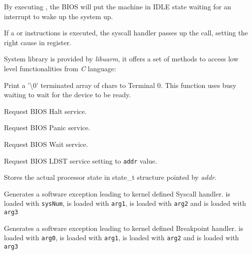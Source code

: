 
By executing , the BIOS will put the machine in IDLE state waiting for an interrupt to wake up the system up.


If a  or  instructions is executed, the syscall handler passes up the call, setting the right cause in  register.

\label{sec:man:systemLibrary}

System library is provided by \emph{libuarm}, it offers a set of methods to access low level functionalities from \emph{C} language:


Print a '\textbackslash0' terminated array of chars to Terminal 0.
This function uses busy waiting to wait for the device to be ready.

\label{sec:man:HALT}

Request BIOS Halt service.


Request BIOS Panic service.


Request BIOS Wait service.


Request BIOS LDST service setting  to \texttt{addr} value.


Stores the actual processor state in state\_t structure pointed by \emph{addr}.

\label{sec:man:SYSCALL}

Generates a software exception leading to kernel defined Syscall handler.
 is loaded with \texttt{sysNum},  is loaded with \texttt{arg1},  is loaded with \texttt{arg2} and  is loaded with \texttt{arg3}


Generates a software exception leading to kernel defined Breakpoint handler.
 is loaded with \texttt{arg0},  is loaded with \texttt{arg1},  is loaded with \texttt{arg2} and  is loaded with \texttt{arg3}

